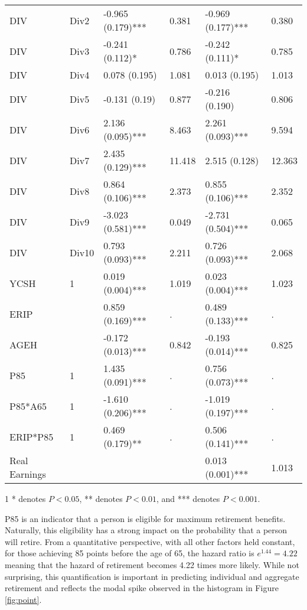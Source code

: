 \begin{table}[htbp]
\begin{threeparttable}
\begin{tabular}{llL{2.5cm}L{1.5cm}L{2.5cm}L{1.5cm}}
			DIV & Div2  & -0.965 (0.179)*** & 0.381 & -0.969 (0.177)*** & 0.380 \\
			DIV & Div3  & -0.241 (0.112)* & 0.786 & -0.242 (0.111)* & 0.785 \\
			DIV & Div4  & 0.078 (0.195) & 1.081 & 0.013 (0.195) & 1.013 \\
			DIV & Div5  & -0.131 (0.19) & 0.877 & -0.216 (0.190) & 0.806 \\
			DIV & Div6  & 2.136 (0.095)*** & 8.463 & 2.261 (0.093)*** & 9.594 \\
			DIV & Div7  & 2.435 (0.129)*** & 11.418 & 2.515 (0.128) & 12.363 \\
			DIV & Div8  & 0.864 (0.106)*** & 2.373 & 0.855 (0.106)*** & 2.352 \\
			DIV & Div9  & -3.023 (0.581)*** & 0.049 & -2.731 (0.504)*** & 0.065 \\
			DIV & Div10 & 0.793 (0.093)*** & 2.211 & 0.726 (0.093)*** & 2.068 \\
			YCSH  & 1     & 0.019 (0.004)*** & 1.019 & 0.023 (0.004)*** & 1.023 \\
			ERIP  &       & 0.859 (0.169)*** & .     & 0.489 (0.133)*** & . \\
			AGEH  &       & -0.172 (0.013)*** & 0.842 & -0.193 (0.014)*** & 0.825 \\
			P85   & 1     & 1.435 (0.091)*** & .     & 0.756 (0.073)*** & . \\
			P85*A65 & 1     & -1.610 (0.206)*** & .     & -1.019 (0.197)*** & . \\
			ERIP*P85 & 1     & 0.469 (0.179)** & .     & 0.506 (0.141)*** & . \\
			Real Earnings &       &       &       & 0.013 (0.001)*** & 1.013 \\
			\bottomrule
		\end{tabular}%
		\begin{tablenotes}
			\item[1] * denotes $P<0.05$, ** denotes $P<0.01$, and *** denotes $P<0.001$.
		\end{tablenotes}
	\end{threeparttable}
	\label{tab:paraest.}%
\end{table}%
P85 is an indicator that a person is eligible for maximum retirement benefits. Naturally, this eligibility has a strong impact on the probability that a person will retire.  From a quantitative perspective,  with all other factors held constant, for those achieving 85 points before the age of 65, the hazard ratio is $e^{1.44} = 4.22$ meaning that the hazard of retirement becomes 4.22 times more likely. While not surprising, this quantification is important in predicting individual and aggregate retirement and reflects the modal spike observed in the histogram in Figure \ref{fig:point}.

